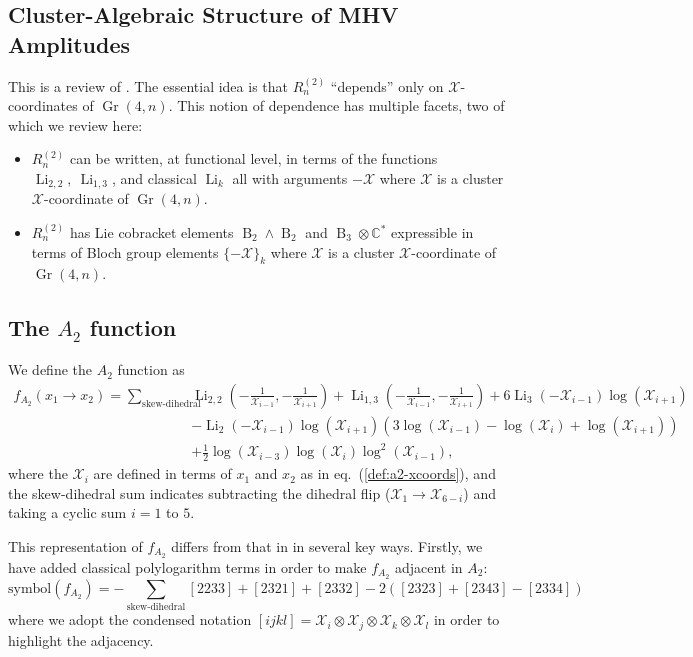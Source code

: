 \documentclass[11pt]{article}
\DeclareMathOperator{\B}{B}
\DeclareMathOperator{\Gr}{Gr}
\DeclareMathOperator{\Li}{Li}
\def\x{\mathcal{X}}
\def\xcoord{$\mathcal{X}$-coordinate }
\def\xcoords{$\mathcal{X}$-coordinates }
\def\pdfeq#1{\texorpdfstring{$#1$}{a}}
\begin{document}
\subsection{Cluster-Algebraic Structure of MHV Amplitudes}\label{sec:cluster-algebra-R2n}

This is a review of \cite{Golden:2013xva,Golden:2014xqa,Golden:2014pua}. The essential idea is that $R^{(2)}_n$ ``depends'' only on \xcoords of $\Gr(4,n)$. This notion of dependence has multiple facets, two of which we review here: 
\begin{itemize}
	\item $R^{(2)}_n$ can be written, at functional level, in terms of the functions $\Li_{2,2},~\Li_{1,3}$, and classical $\Li_k$ all with arguments $-\mathcal{X}$ where $\mathcal{X}$ is a cluster \xcoord of $\Gr(4,n)$.
	\item $R^{(2)}_n$ has Lie cobracket elements $\B_2 \wedge \B_2$ and $\B_3 \otimes \mathbb{C}^*$ expressible in terms of Bloch group elements $\{-\mathcal{X}\}_k$ where $\mathcal{X}$ is a cluster \xcoord of $\Gr(4,n)$. 
\end{itemize}

\subsection{The \pdfeq{A_2} function}
We define the $A_2$ function as
\begin{equation}\label{def:a2-function}
\begin{split}
	f_{A_2}(x_1 \to x_2)  = \sum_{\text{skew-dihedral}} &\Li_{2,2}\left(-\frac{1}{\x_{i-1}},-\frac{1}{\x_{i+1}}\right) + \Li_{1,3}\left(-\frac{1}{\x_{i-1}},-\frac{1}{\x_{i+1}}\right)+6 \Li_3\left(-\x_{i-1}\right) \log \left(\x_{i+1}\right)
	\\&-\Li_2\left(-\x_{i-1}\right) \log \left(\x_{i+1}\right) \left(3 \log \left(\x_{i-1}\right)-\log \left(\x_i\right)+\log \left(\x_{i+1}\right)\right)
	\\&+\frac{1}{2} \log \left(\x_{i-3}\right) \log \left(\x_i\right) \log ^2\left(\x_{i-1}\right),
\end{split}
\end{equation}
where the $\x_i$ are defined in terms of $x_1$ and $x_2$ as in eq.~(\ref{def:a2-xcoords}), and the skew-dihedral sum indicates subtracting the dihedral flip ($\x_1 \to \x_{6-i}$) and taking a cyclic sum $i=1$ to $5$.

This representation of $f_{A_2}$ differs from that in \cite{Golden:2014xqa} in several key ways. Firstly, we have added classical polylogarithm terms in order to make $f_{A_2}$ adjacent in $A_2$:
\begin{equation}
   \text{symbol}(f_{A_2}) = -\sum_{\text{skew-dihedral}}[2233]+[2321]+[2332]-2([2323]+[2343]-[2334])
\end{equation}
where we adopt the condensed notation $[ijkl] = \x_i\otimes\x_j\otimes\x_k\otimes\x_l$ in order to highlight the adjacency. 
\end{document}
